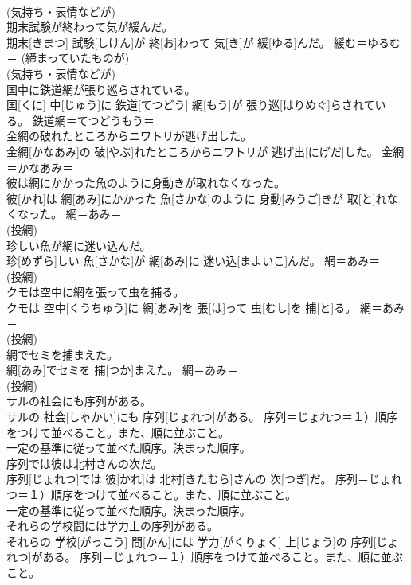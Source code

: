 \documentclass[8pt]{extreport}
\begin{document}
\begin{CJK}{UTF8}{min}
{\\	(気持ち・表情などが) 
\\	期末試験が終わって気が緩んだ。	
\\	期末[きまつ] 試験[しけん]が 終[お]わって 気[き]が 緩[ゆる]んだ。	緩む＝ゆるむ＝ (締まっていたものが) 
\\	(気持ち・表情などが) 
\\	国中に鉄道網が張り巡らされている。	
\\	国[くに] 中[じゅう]に 鉄道[てつどう] 網[もう]が 張り巡[はりめぐ]らされている。	鉄道網＝てつどうもう＝ 
\\	金網の破れたところからニワトリが逃げ出した。	
\\	金網[かなあみ]の 破[やぶ]れたところからニワトリが 逃げ出[にげだ]した。	金網＝かなあみ＝ 
\\	彼は網にかかった魚のように身動きが取れなくなった。	
\\	彼[かれ]は 網[あみ]にかかった 魚[さかな]のように 身動[みうご]きが 取[と]れなくなった。	網＝あみ＝ 
\\	(投網) 
\\	珍しい魚が網に迷い込んだ。	
\\	珍[めずら]しい 魚[さかな]が 網[あみ]に 迷い込[まよいこ]んだ。	網＝あみ＝ 
\\	(投網) 
\\	クモは空中に網を張って虫を捕る。	
\\	クモは 空中[くうちゅう]に 網[あみ]を 張[は]って 虫[むし]を 捕[と]る。	網＝あみ＝ 
\\	(投網) 
\\	網でセミを捕まえた。	
\\	網[あみ]でセミを 捕[つか]まえた。	網＝あみ＝ 
\\	(投網) 
\\	サルの社会にも序列がある。	
\\	サルの 社会[しゃかい]にも 序列[じょれつ]がある。	序列＝じょれつ＝１）順序をつけて並べること。また、順に並ぶこと。 　　　　　　　　
\\	一定の基準に従って並べた順序。決まった順序。
\\	序列では彼は北村さんの次だ。	
\\	序列[じょれつ]では 彼[かれ]は 北村[きたむら]さんの 次[つぎ]だ。	序列＝じょれつ＝１）順序をつけて並べること。また、順に並ぶこと。 　　　　　　　　
\\	一定の基準に従って並べた順序。決まった順序。
\\	それらの学校間には学力上の序列がある。	
\\	それらの 学校[がっこう] 間[かん]には 学力[がくりょく] 上[じょう]の 序列[じょれつ]がある。	序列＝じょれつ＝１）順序をつけて並べること。また、順に並ぶこと。 　　　　　　　　
}
\end{CJK}
\end{document}
